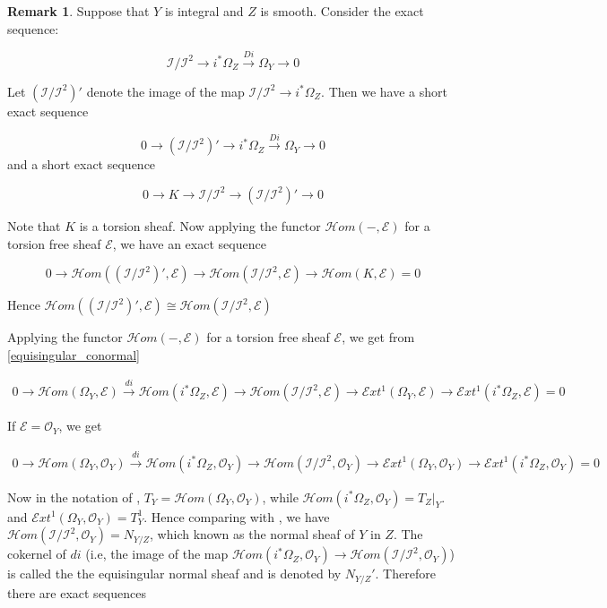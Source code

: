 \documentclass[11pt,twoside]{amsart}
\theoremstyle{plain}
\numberwithin{equation}{section}
\theoremstyle{definition}
\newtheorem{remark}[theorem]{Remark}
\begin{document}
\begin{remark}\label{dualizing_conormal_sequence}
Suppose that $Y$ is integral and $Z$ is smooth. Consider the exact sequence:
 
$$\mathcal{I}/\mathcal{I}^2 \to i^*\Omega_Z \xrightarrow{Di} \Omega_Y \to 0$$

Let $(\mathcal{I}/\mathcal{I}^2)'$ denote the image of the map 
$\mathcal{I}/\mathcal{I}^2 \to i^*\Omega_Z$. Then we have a short exact sequence

\begin{equation}\label{equisingular_conormal}
0 \to (\mathcal{I}/\mathcal{I}^2)' \to i^*\Omega_Z \xrightarrow{Di} \Omega_Y \to 0
\end{equation}
and a short exact sequence 

$$0 \to K \to \mathcal{I}/\mathcal{I}^2 \to (\mathcal{I}/\mathcal{I}^2)' \to 0 $$

Note that $K$ is a torsion sheaf. Now applying the functor $\mathcal{H}om(-,\mathcal{E})$ for a torsion free sheaf $\mathcal{E}$, we have an exact sequence 

$$0 \to \mathcal{H}om((\mathcal{I}/\mathcal{I}^2)', \mathcal{E}) \to \mathcal{H}om(\mathcal{I}/\mathcal{I}^2, \mathcal{E}) \to \mathcal{H}om(K, \mathcal{E}) = 0$$

Hence $\mathcal{H}om((\mathcal{I}/\mathcal{I}^2)', \mathcal{E}) \cong \mathcal{H}om(\mathcal{I}/\mathcal{I}^2, \mathcal{E})$

Applying the functor $\mathcal{H}om(-, \mathcal{E})$ for a torsion free sheaf $\mathcal{E}$, we get from \ref{equisingular_conormal}

\begin{align*}
0 \to \mathcal{H}om(\Omega_Y, \mathcal{E}) \xrightarrow{di}   \mathcal{H}om(i^*\Omega_Z, \mathcal{E}) \to \mathcal{H}om(\mathcal{I}/\mathcal{I}^2, \mathcal{E}) \to \mathcal{E}xt^1(\Omega_Y, \mathcal{E}) \to \mathcal{E}xt^1(i^*\Omega_Z, \mathcal{E}) = 0
\end{align*}

If $\mathcal{E} = \mathcal{O}_Y$, we get

\begin{align*}
0 \to \mathcal{H}om(\Omega_Y, \mathcal{O}_Y) \xrightarrow{di}   \mathcal{H}om(i^*\Omega_Z, \mathcal{O}_Y) \to \mathcal{H}om(\mathcal{I}/\mathcal{I}^2, \mathcal{O}_Y) \to \mathcal{E}xt^1(\Omega_Y, \mathcal{O}_Y) \to \mathcal{E}xt^1(i^*\Omega_Z, \mathcal{O}_Y) = 0
\end{align*}

Now in the notation of \cite[Proposition $1.1.9$, Theorem $1.1.10$]{Ser}, $T_Y = \mathcal{H}om(\Omega_Y, \mathcal{O}_Y)$, while $\mathcal{H}om(i^*\Omega_Z, \mathcal{O}_Y) = T_Z|_Y$. and 
$\mathcal{E}xt^1(\Omega_Y, \mathcal{O}_Y) = T_Y^1$. Hence comparing with \cite[Proposition $1.1.9$ (ii)]{Ser}, we have $\mathcal{H}om(\mathcal{I}/\mathcal{I}^2, \mathcal{O}_Y) = N_{Y/Z}$, which known as the normal sheaf of $Y$ in $Z$. The cokernel of $di$ (i.e, the image of the map $\mathcal{H}om(i^*\Omega_Z, \mathcal{O}_Y) \to \mathcal{H}om(\mathcal{I}/\mathcal{I}^2, \mathcal{O}_Y)$) is called the the equisingular normal sheaf and is denoted by $N_{Y/Z}'$. Therefore there are exact sequences


\end{remark}
\end{document}
